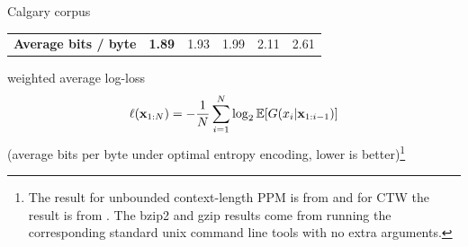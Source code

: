 \documentclass[xcolor=dvipsnames]{beamer}
\begin{document}
{\begin{block}{Calgary corpus}
\begin{table}[t]
\begin{center}
\begin{tabular}{l||r|c|c|c|c}
\textbf{Average bits / byte}      &{\bf 1.89}   & 1.93  &  1.99 & 2.11 & 2.61 \\%
\end{tabular}
\end{center}
\label{table:results}
\end{table}
\end{block}
weighted average log-loss
\[\ell(\xbf_{1:N}) = -\frac{1}{N}\sum_{i=1}^N \log_2 \EE[G(x_i|\xbf_{1:i-1})]\]
(average bits per byte under optimal entropy encoding, lower is better)\footnote{The result for unbounded context-length PPM is from 
\citep{Cleary1997b} and for CTW the result is from \citep{Willems2009}.   The
bzip2 and gzip results come from running the corresponding standard unix
command line tools with no extra arguments.}


}



\end{document}
